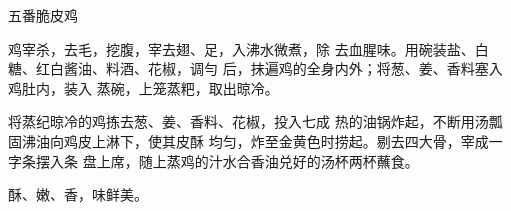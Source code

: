 \begin{recipe}{五番脆皮鸡}

\ingredients


\cooking

\step 鸡宰杀，去毛，挖腹，宰去翅、足，入沸水微煮，除 去血腥味。用碗装盐、白糖、红白酱油、料酒、花椒，调勻 后，抹遍鸡的全身内外；将葱、姜、香料塞入鸡肚内，装入 蒸碗，上笼蒸粑，取出晾冷。

将蒸纪晾冷的鸡拣去葱、姜、香料、花椒，投入七成 热的油锅炸起，不断用汤瓢固沸油向鸡皮上淋下，使其皮酥 均匀，炸至金黄色时捞起。剔去四大骨，宰成一字条摆入条 盘上席，随上蒸鸡的汁水合香油兑好的汤杯两杯蘸食。

\notes

酥、嫩、香，味鲜美。

\end{recipe}

